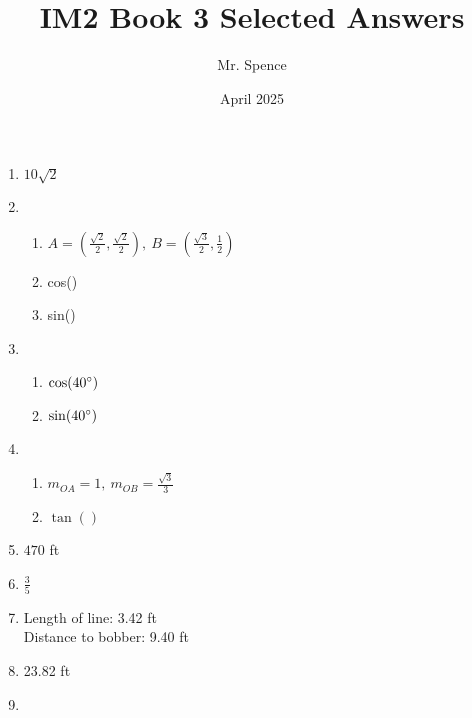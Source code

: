 \documentclass{article}
\title{IM2 Book 3 Selected Answers}
\author{Mr. Spence}
\date{April 2025}
\begin{document}
\maketitle

\begin{enumerate}

\item $10 \sqrt{2}$

\item 

	\begin{enumerate}
	
	\item $A = \left( \frac{\sqrt{2}}{2},  \frac{\sqrt{2}}{2} \right), \ B = \left( \frac{\sqrt{3}}{2}, \frac{1}{2} \right)$
	
	\item cos()
	
	\item sin()
	
	\end{enumerate}

\item

	\begin{enumerate}
	
	\item $\cos (40 \degree)$
	
	\item $\sin (40 \degree)$
	
	\end{enumerate}
	
\item

	\begin{enumerate}
	
	\item $m_{OA} = 1, \ m_{OB} = \frac{\sqrt{3}}{3}$
	
	\item $\tan()$
	
	\end{enumerate}
	
\item $470$ ft

\item $\frac{3}{5}$

\item Length of line: 3.42 ft \\ Distance to bobber: 9.40 ft

\item 23.82 ft

\item 


\end{enumerate}
\end{document}
